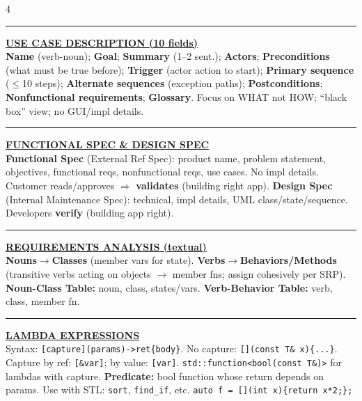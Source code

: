 \documentclass[landscape,letterpaper]{article}
\newcommand{\h}[1]{\textbf{#1}}
\newcommand{\hd}[1]{\vspace{1pt}\noindent\textbf{\underline{#1}}\vspace{-1pt}}
\begin{document}
\begin{multicols}{4}
\vspace{-1pt}\noindent\rule{\columnwidth}{0.2pt}\vspace{-3pt}

\hd{USE CASE DESCRIPTION (10 fields)}\\[-2pt]
\h{Name} (verb-noun); \h{Goal}; \h{Summary} (1--2 sent.); \h{Actors}; \h{Preconditions} (what must be true before); \h{Trigger} (actor action to start); \h{Primary sequence} ($\leq$10 steps); \h{Alternate sequences} (exception paths); \h{Postconditions}; \h{Nonfunctional requirements}; \h{Glossary}. Focus on WHAT not HOW; ``black box'' view; no GUI/impl details.\\[-2pt]

\vspace{-1pt}\noindent\rule{\columnwidth}{0.2pt}\vspace{-3pt}

\hd{FUNCTIONAL SPEC \& DESIGN SPEC}\\[-2pt]
\h{Functional Spec} (External Ref Spec): product name, problem statement, objectives, functional reqs, nonfunctional reqs, use cases. No impl details. Customer reads/approves $\Rightarrow$ \h{validates} (building right app). \h{Design Spec} (Internal Maintenance Spec): technical, impl details, UML class/state/sequence. Developers \h{verify} (building app right).\\[-2pt]

\vspace{-1pt}\noindent\rule{\columnwidth}{0.2pt}\vspace{-3pt}

\hd{REQUIREMENTS ANALYSIS (textual)}\\[-2pt]
\h{Nouns$\to$Classes} (member vars for state). \h{Verbs$\to$Behaviors/Methods} (transitive verbs acting on objects $\to$ member fns; assign cohesively per SRP). \h{Noun-Class Table:} noun, class, states/vars. \h{Verb-Behavior Table:} verb, class, member fn.\\[-2pt]

\vspace{-1pt}\noindent\rule{\columnwidth}{0.2pt}\vspace{-3pt}

\hd{LAMBDA EXPRESSIONS}\\[-2pt]
Syntax: \texttt{[capture](params)->ret\{body\}}. No capture: \texttt{[](const T\& x)\{...\}}. Capture by ref: \texttt{[\&var]}; by value: \texttt{[var]}. \texttt{std::function\textless bool(const T\&)\textgreater} for lambdas with capture. \h{Predicate:} bool function whose return depends on params. Use with STL: \texttt{sort}, \texttt{find\_if}, etc. \texttt{auto f = [](int x)\{return x*2;\};}\\[-2pt]


\end{multicols}
\end{document}

